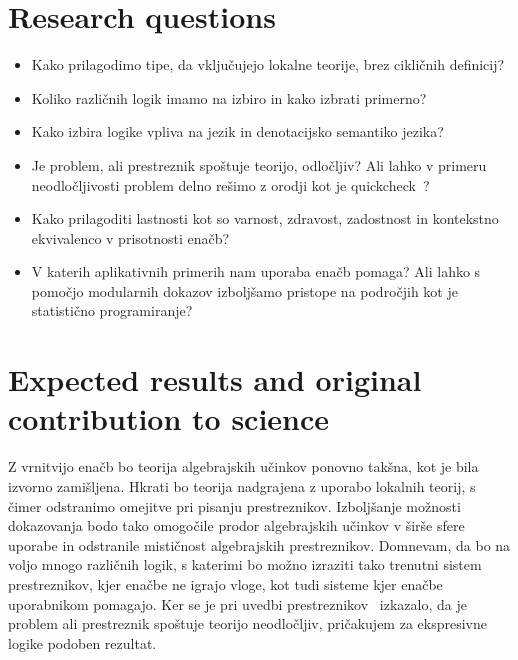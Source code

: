 \documentclass{article}
\begin{document}
\section*{Research questions}

\begin{itemize}
  \item Kako prilagodimo tipe, da vključujejo lokalne teorije, brez cikličnih definicij?
  \item Koliko različnih logik imamo na izbiro in kako izbrati primerno?
  \item Kako izbira logike vpliva na jezik in denotacijsko semantiko jezika?
  \item Je problem, ali prestreznik spoštuje teorijo, odločljiv? Ali lahko v primeru neodločljivosti problem delno rešimo z orodji kot je quickcheck~\cite{DBLP:conf/icfp/ClaessenH00}?
  \item Kako prilagoditi lastnosti kot so varnost, zdravost, zadostnost in kontekstno ekvivalenco v prisotnosti enačb?
  \item V katerih aplikativnih primerih nam uporaba enačb pomaga? Ali lahko s pomočjo modularnih dokazov izboljšamo pristope na področjih kot je statistično programiranje?
\end{itemize}


\section*{Expected results and original contribution to science}

Z vrnitvijo enačb  bo teorija algebrajskih učinkov ponovno takšna, kot je bila izvorno zamišljena. Hkrati bo teorija nadgrajena z uporabo lokalnih teorij, s čimer odstranimo omejitve pri pisanju prestreznikov. Izboljšanje možnosti dokazovanja bodo tako omogočile prodor algebrajskih učinkov v širše sfere uporabe in odstranile mističnost algebrajskih prestreznikov. Domnevam, da bo na voljo mnogo različnih logik, s katerimi bo možno izraziti tako trenutni sistem prestreznikov, kjer enačbe ne igrajo vloge, kot tudi sisteme kjer enačbe uporabnikom pomagajo. Ker se je pri uvedbi prestreznikov~\cite{DBLP:conf/esop/PlotkinP09} izkazalo, da je problem ali prestreznik spoštuje teorijo neodločljiv, pričakujem za ekspresivne logike podoben rezultat.




\end{document}

